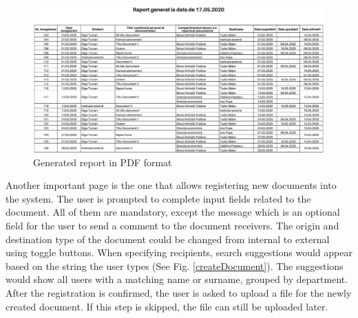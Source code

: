 \begin{figure}[H]
    \centering
    \includegraphics[width=5.5in]{images/app/report_pdf}
    \caption{Generated report in PDF format}
    \label{pdfReport}
\end{figure}

Another important page is the one that allows registering new documents into the system. The user is prompted to complete input fields related to the document. All of them are mandatory, except the message which is an optional field for the user to send a comment to the document receivers. The origin and destination type of the document could be changed from internal to external using toggle buttons. When specifying recipients, search suggestions would appear based on the string the user types (See Fig. \ref{createDocument}). The suggestions would show all users with a matching name or surname, grouped by department. After the registration is confirmed, the user is asked to upload a file for the newly created document. If this step is skipped, the file can still be uploaded later.

